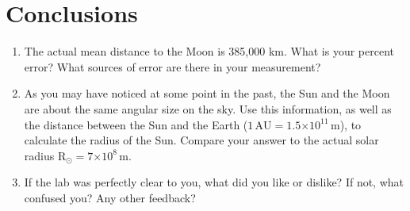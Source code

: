 \documentclass[12pt]{article}%
\providecommand{\e}[1]{\ensuremath{\times 10^{#1}}} %
\begin{document}
\section{Conclusions}
\begin{enumerate}
    \item The actual mean distance to the Moon is 385,000 km. What is your percent error? What sources of error are there in your measurement?
    
    
    \item As you may have noticed at some point in the past, the Sun and the Moon are about the same angular size on the sky. 
    Use this information, as well as the distance between the Sun and the Earth ($1 \, \mathrm{AU} = 1.5 \e{11} \, \mathrm{m}$), to calculate the radius of the Sun. 
    Compare your answer to the actual solar radius $\mathrm{R}_{\odot} = 7 \e{8} \, \mathrm{m}$.


    \item If the lab was perfectly clear to you, what did you like or dislike? If not, what confused you? Any other feedback?
\end{enumerate}
\end{document}
